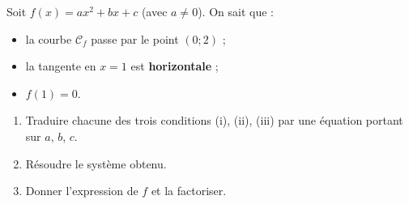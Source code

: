 \documentclass[11pt,a4paper]{article}
\begin{document}
\begin{exo}
Soit $f(x)=ax^2+bx+c$ (avec $a\neq 0$). On sait que :
\begin{itemize}[leftmargin=7mm,itemsep=1pt]
\item[(i)] la courbe $\mathcal{C}_f$ passe par le point $(0;2)$ ;
\item[(ii)] la tangente en $x=1$ est \textbf{horizontale} ;
\item[(iii)] $f(1)=0$.
\end{itemize}
\begin{enumerate}[label=\alph*),leftmargin=7mm,itemsep=2pt]
\item Traduire chacune des trois conditions (i), (ii), (iii) par une équation portant sur $a$, $b$, $c$.
\item Résoudre le système obtenu.
\item Donner l'expression de $f$ et la factoriser.
\end{enumerate}
\end{exo}
\end{document}
